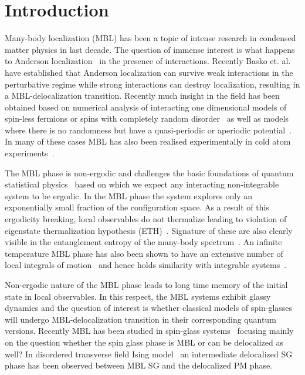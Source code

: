 \documentclass[prl,aps,twocolumn,floats,nofootinbib]{revtex4}
\begin{document}
\section{Introduction}

Many-body localization (MBL) has been a topic of intense research in condensed matter physics in last decade. 
 The question of immense interest is what happens to Anderson localization~\cite{Anderson} in the presence of interactions. Recently Basko et. al.~\cite{Basko} have established that Anderson localization can survive weak interactions in the perturbative regime while strong interactions can destroy localization, resulting in a MBL-delocalization transition. Recently much insight in the field has been obtained based on numerical analysis of interacting one dimensional models of spin-less fermions or spins with completely random disorder~\cite{Husein,Huse2010,Bardarson2015,Sirker,Mueller2016} as well as models where there is no randomness but have a quasi-periodic or aperiodic potential~\cite{Huse2013,Subroto,Sdsarma,garg}. In many of these cases MBL has also been realised experimentally in cold atom experiments~\cite{expt}.

The MBL phase is non-ergodic and challenges the basic foundations of quantum statistical physics~\cite{Huse,Altman} based on which we expect any interacting non-integrable system to be ergodic. In the MBL phase the system explores only an exponentially small fraction of the configuration space. As a result of this ergodicity breaking, local observables do not thermalize leading to violation of eigenstate thermalization hypothesis (ETH)~\cite{Deutsch,Srednicki,Rigol}. Signature of these are also clearly visible in the entanglement entropy of the many-body spectrum~\cite{Nayak,Huse2013, Sdsarma}. An infinite temperature MBL phase has also been shown to have an  extensive number of local integrals of motion~\cite{Abanin,Mueller} and hence holds similarity with integrable systems~\cite{Huse2014,shastry}. 

Non-ergodic nature of the MBL phase leads to long time memory of the initial state in local observables. In this respect, the MBL systems exhibit glassy dynamics and the question of interest is whether classical models of spin-glasses will undergo MBL-delocalization transition in their corresponding quantum versions.  Recently MBL has been studied in spin-glass systems~\cite{Bardarson2014,Lee,Laumann,Baldwin} focusing mainly on the  question whether the spin glass phase is MBL or can be delocalized as well? In disordered transverse field Ising model~\cite{Bardarson2014} an intermediate delocalized SG phase has been observed between MBL SG and the delocalized PM phase.
\end{document}
